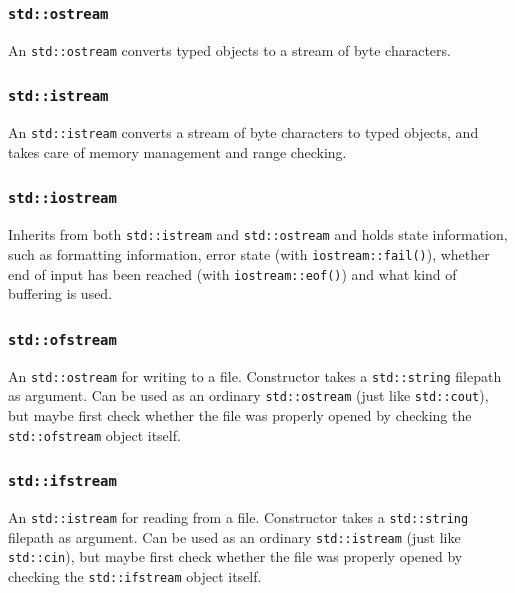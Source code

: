 \documentclass[table, xcdraw]{article}%
\begin{document}
\subsubsection{\texttt{std::ostream}}

An \texttt{std::ostream} converts typed objects to a stream of byte characters.

\subsubsection{\texttt{std::istream}}

An \texttt{std::istream} converts a stream of byte characters to typed objects, and takes care of memory management and range checking.

\subsubsection{\texttt{std::iostream}}

Inherits from both \texttt{std::istream} and \texttt{std::ostream} and holds state information, such as formatting information, error state (with \texttt{iostream::fail()}), whether end of input has been reached (with \texttt{iostream::eof()}) and what kind of buffering is used.

\subsubsection{\texttt{std::ofstream}}

An \texttt{std::ostream} for writing to a file. Constructor takes a \texttt{std::string} filepath as argument. Can be used as an ordinary \texttt{std::ostream} (just like \texttt{std::cout}), but maybe first check whether the file was properly opened by checking the \texttt{std::ofstream} object itself.

\subsubsection{\texttt{std::ifstream}}

An \texttt{std::istream} for reading from a file. Constructor takes a \texttt{std::string} filepath as argument. Can be used as an ordinary \texttt{std::istream} (just like \texttt{std::cin}), but maybe first check whether the file was properly opened by checking the \texttt{std::ifstream} object itself.
\end{document}
